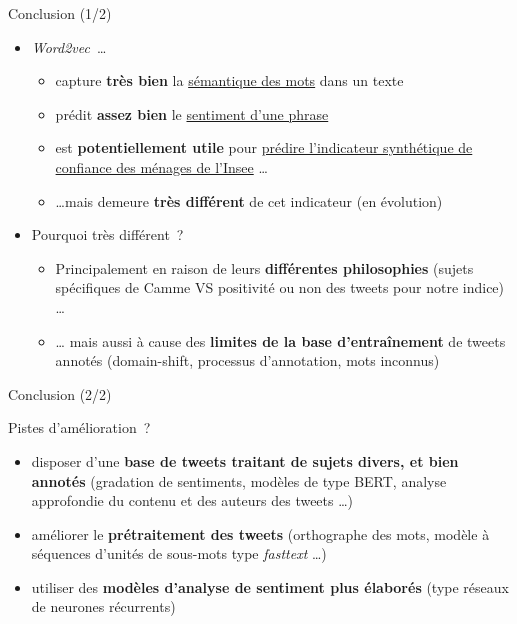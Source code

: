 \documentclass[10pt,xcolor=table,color={dvipsnames,usenames},ignorenonframetext,usepdftitle=false,french]{beamer}
\providecommand{\tightlist}{%
  \setlength{\parskip}{0pt}
  }
\begin{document}
\begin{frame}{Conclusion (1/2)}
\protect\hypertarget{conclusion-12}{}

\begin{itemize}
\item
  \emph{Word2vec}~\dots

  \begin{itemize}
  \tightlist
  \item
    capture \textbf{très bien} la \underline{sémantique des mots} dans
    un texte
  \item
    prédit \textbf{assez bien} le \underline{sentiment d’une phrase}
  \item
    est \textbf{potentiellement utile} pour
    \underline{prédire l’indicateur synthétique de}
    \underline{confiance des ménages de l’Insee} \dots
  \item
    \dots mais demeure \textbf{très différent} de cet indicateur (en
    évolution)
  \end{itemize}
\end{itemize}

\bigskip

\pause

\begin{itemize}
\tightlist
\item
  Pourquoi très différent~?

  \begin{itemize}
  \tightlist
  \item
    Principalement en raison de leurs \textbf{différentes philosophies}
    \footnotesize (sujets spécifiques de Camme VS positivité ou non des
    tweets pour notre indice) \normalsize \dots
  \item
    \dots{} mais aussi à cause des \textbf{limites de la base
    d'entraînement} de tweets annotés \footnotesize (domain-shift,
    processus d'annotation, mots inconnus) \normalsize
  \end{itemize}
\end{itemize}

\end{frame}

\begin{frame}{Conclusion (2/2)}
\protect\hypertarget{conclusion-22}{}

Pistes d'amélioration~?

\begin{itemize}
\item
  disposer d'une \textbf{base de tweets traitant de sujets divers, et
  bien annotés} \footnotesize (gradation de sentiments, modèles de type
  BERT, analyse approfondie du contenu et des auteurs des tweets \dots)
  \normalsize
\item
  améliorer le \textbf{prétraitement des tweets}
  \footnotesize (orthographe des mots, modèle à séquences d'unités de
  sous-mots type \emph{fasttext} \dots)\normalsize
\item
  utiliser des \textbf{modèles d'analyse de sentiment plus élaborés}
  \footnotesize  (type réseaux de neurones récurrents)\normalsize
\end{itemize}

\end{frame}
\end{document}
